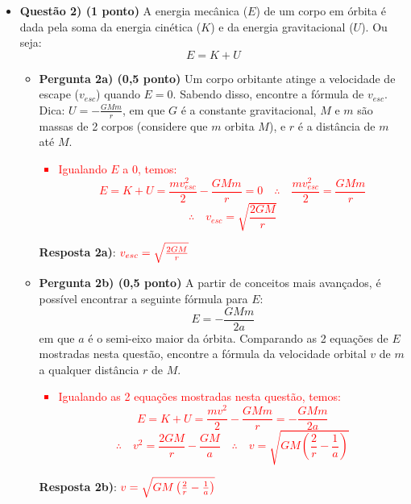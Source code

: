 \documentclass[a4paper, 12pt]{article}
\newcommand{\red}[1]
{
	\textcolor{red}{#1}
}
\begin{document}
\begin{flushleft}
\begin{itemize}
		\item \textbf{Questão 2) (1 ponto)} A energia mecânica ($E$) de um corpo em órbita é dada pela soma da energia cinética ($K$) e da energia gravitacional ($U$). Ou seja:
			$$E=K+U$$
			\begin{itemize}
				\item \textbf{Pergunta 2a) (0,5 ponto)} Um corpo orbitante atinge a velocidade de escape ($v_{esc}$) quando $E=0$. Sabendo disso, encontre a fórmula de $v_{esc}$. \linebreak
					Dica: $U = - \frac{GMm}{r}$, em que $G$ é a constante gravitacional, $M$ e $m$ são massas de 2 corpos (considere que $m$ orbita $M$), e $r$ é a distância de $m$ até $M$.
					\red{\begin{itemize}
						\item Igualando $E$ a $0$, temos:
							$$E = K + U = \frac{mv_{esc}^2}{2} - \frac{GMm}{r} = 0 \quad \therefore \quad \frac{mv_{esc}^2}{2} = \frac{GMm}{r}$$
							$$\therefore \quad v_{esc} = \sqrt{\frac{2GM}{r}}$$
					\end{itemize}}
					\textbf{Resposta 2a)}: $\red{v_{esc} = \sqrt{\frac{2GM}{r}}}$
				\item \textbf{Pergunta 2b) (0,5 ponto)} A partir de conceitos mais avançados, é possível encontrar a seguinte fórmula para $E$:
					$$E = -\frac{GMm}{2a}$$
					em que $a$ é o semi-eixo maior da órbita. Comparando as 2 equações de $E$ mostradas nesta questão, encontre a fórmula da velocidade orbital $v$ de $m$ a qualquer distância $r$ de $M$.
					\red{\begin{itemize}
						\item Igualando as 2 equações mostradas nesta questão, temos:
							$$E = K + U = \frac{mv^2}{2} - \frac{GMm}{r} = - \frac{GMm}{2a}$$
							$$\therefore \quad v^2 = \frac{2GM}{r} - \frac{GM}{a} \quad \therefore \quad v = \sqrt{GM \left( \frac{2}{r} - \frac{1}{a} \right)}$$
					\end{itemize}}
					\textbf{Resposta 2b)}: $\red{v = \sqrt{GM \left( \frac{2}{r} - \frac{1}{a} \right)}}$
			\end{itemize}
			

\end{itemize}
\end{flushleft}
\end{document}
